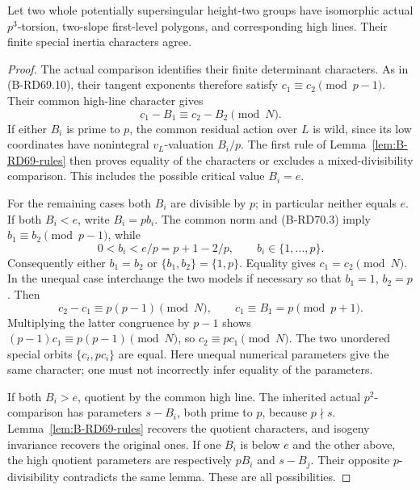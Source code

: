 \begin{lemma}
\label{lem:B-RD70-high}
Let two whole potentially supersingular height-two groups have
isomorphic actual \(p^3\)-torsion, two-slope first-level polygons,
and corresponding high lines. Their finite special inertia
characters agree.
\end{lemma}
\begin{proof}
The actual comparison identifies their finite determinant
characters. As in (B-RD69.10), their tangent exponents therefore
satisfy \(c_1\equiv c_2\pmod{p-1}\).
Their common high-line character gives
\[
 c_1-B_1\equiv c_2-B_2\pmod N .
 \tag{B-RD70.3}
\]
If either \(B_i\) is prime to \(p\), the common residual action
over \(L\) is wild, since its low coordinates have nonintegral
\(v_L\)-valuation \(B_i/p\). The first rule of
Lemma~\ref{lem:B-RD69-rules} then proves equality of the
characters or excludes a mixed-divisibility comparison.
This includes the possible critical value \(B_i=e\).

For the remaining cases both \(B_i\) are divisible by \(p\);
in particular neither equals \(e\).
If both \(B_i<e\), write \(B_i=pb_i\).
The common norm and (B-RD70.3) imply
\(b_1\equiv b_2\pmod{p-1}\), while
\[
 0<b_i<e/p=p+1-2/p,\qquad b_i\in\{1,\ldots,p\}.
 \tag{B-RD70.4}
\]
Consequently either \(b_1=b_2\) or
\(\{b_1,b_2\}=\{1,p\}\).
Equality gives \(c_1=c_2\pmod N\).
In the unequal case interchange the two models if necessary
so that \(b_1=1\), \(b_2=p\). Then
\[
 c_2-c_1\equiv p(p-1)\pmod N,\qquad
 c_1\equiv B_1=p\pmod{p+1}.
 \tag{B-RD70.5}
\]
Multiplying the latter congruence by \(p-1\) shows
\((p-1)c_1\equiv p(p-1)\pmod N\), so \(c_2\equiv pc_1\pmod N\).
The two unordered special orbits \(\{c_i,pc_i\}\) are equal.
Here unequal numerical parameters give the same character;
one must not incorrectly infer equality of the parameters.

If both \(B_i>e\), quotient by the common high line.
The inherited actual \(p^2\)-comparison has parameters
\(s-B_i\), both prime to \(p\), because \(p\nmid s\).
Lemma~\ref{lem:B-RD69-rules} recovers the quotient characters,
and isogeny invariance recovers the original ones.
If one \(B_i\) is below \(e\) and the other above, the high
quotient parameters are respectively \(pB_i\) and \(s-B_j\).
Their opposite \(p\)-divisibility contradicts the same lemma.
These are all possibilities.
\end{proof}

